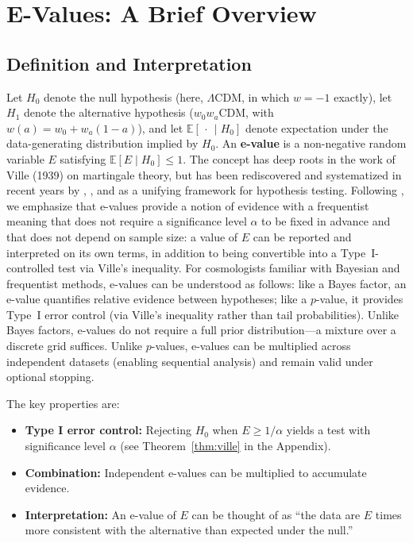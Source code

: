 \documentclass[11pt,a4paper]{article}
\newcommand{\E}{\mathbb{E}}
\newcommand{\LCDM}{$\Lambda$CDM}
\begin{document}
\section{E-Values: A Brief Overview}
\label{sec:evalues}

\subsection{Definition and Interpretation}

Let $H_0$ denote the null hypothesis (here, \LCDM, in which $w = -1$ exactly), let $H_1$ denote the alternative hypothesis ($w_0w_a$CDM, with $w(a) = w_0 + w_a(1-a)$), and let $\E[\,\cdot\, \mid H_0]$ denote expectation under the data-generating distribution implied by $H_0$. An \textbf{e-value} is a non-negative random variable $E$ satisfying $\E[E \mid H_0] \leq 1$. The concept has deep roots in the work of Ville (1939) on martingale theory, but has been rediscovered and systematized in recent years by \citet{Vovk2021}, \citet{Shafer2021}, and \citet{Ramdas2023} as a unifying framework for hypothesis testing. Following \citet{GrunwaldBeyondNeymanPearson}, we emphasize that e-values provide a notion of evidence with a frequentist meaning that does not require a significance level $\alpha$ to be fixed in advance and that does not depend on sample size: a value of $E$ can be reported and interpreted on its own terms, in addition to being convertible into a Type~I-controlled test via Ville's inequality. For cosmologists familiar with Bayesian and frequentist methods, e-values can be understood as follows: like a Bayes factor, an e-value quantifies relative evidence between hypotheses; like a $p$-value, it provides Type~I error control (via Ville's inequality rather than tail probabilities). Unlike Bayes factors, e-values do not require a full prior distribution---a mixture over a discrete grid suffices. Unlike $p$-values, e-values can be multiplied across independent datasets (enabling sequential analysis) and remain valid under optional stopping.

The key properties are:
\begin{itemize}
    \item \textbf{Type I error control:} Rejecting $H_0$ when $E \geq 1/\alpha$ yields a test with significance level $\alpha$ (see Theorem~\ref{thm:ville} in the Appendix).

    \item \textbf{Combination:} Independent e-values can be multiplied to accumulate evidence.

    \item \textbf{Interpretation:} An e-value of $E$ can be thought of as ``the data are $E$ times more consistent with the alternative than expected under the null.''
\end{itemize}
\end{document}
